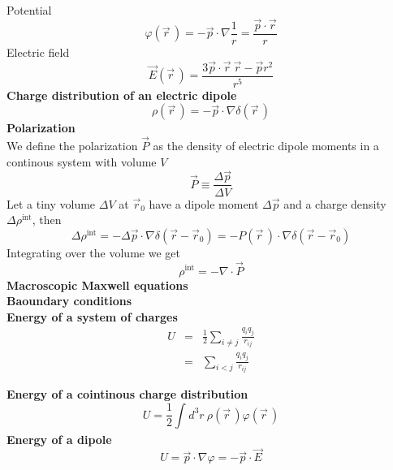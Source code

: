 \documentclass[12pt,a4paper]{article}
\newcommand{\diver}[1]{\nabla \cdot} %
\newcommand{\integral}[3]{\int_{#1}^{#2} d #3 \ } %
\begin{document}
Potential
\begin{equation}
	\varphi(\vec{r}\,) = -\vec{p}\cdot \nabla\frac{1}{r} = \frac{\vec{p}\cdot \vec{r}}{r}
\end{equation}
Electric field
\begin{equation}
	\vec{E}(\vec{r}\,) =  \frac{3\vec{p}\cdot \vec{r} \ \vec{r}-\vec{p}r^2}{r^5}
\end{equation}
\textbf{Charge distribution of an electric dipole}\\
\begin{equation}
	\rho(\vec{r}\,) = -\vec{p} \cdot \nabla \delta (\vec{r}\,)
\end{equation}
\textbf{Polarization}\\
We define the polarization $\vec{P}$ as the density of electric dipole moments in a continous system with volume $V$
\begin{equation}
	\vec{P} \equiv \frac{\Delta \vec{p}}{\Delta V}
\end{equation}
Let a tiny volume $\Delta V$ at $\vec{r}_0$ have a dipole moment $\Delta \vec{p}$ and a charge density $\Delta \rho^{\text{int}}$, then
\begin{equation}
	\Delta \rho^{\text{int}} = -\Delta \vec{p}  \cdot \nabla \delta (\vec{r} -\vec{r}_0) = - P(\vec{r}\,) \cdot \nabla \delta (\vec{r} -\vec{r}_0)
\end{equation}
Integrating over the volume we get
\begin{equation}
 \rho^{\text{int}} = -\diver{} \vec{P}
\end{equation}
\textbf{Macroscopic Maxwell equations}\\

\textbf{Baoundary conditions}\\

\textbf{Energy of a system of charges}\\
	\begin{eqnarray}
		U & = & \frac{1}{2}\sum_{i\neq j} \frac{q_iq_j}{r_{ij}} \\
		& = & \sum_{i<j}\frac{q_iq_j}{r_{ij}}
	\end{eqnarray}

\textbf{Energy of a cointinous charge distribution}\\
\begin{equation}
	U = \frac{1}{2} \integral{}{}{^3r}\rho(\vec{r}\,) \varphi (\vec{r}\,)
\end{equation}
\textbf{Energy of a dipole}\\
\begin{equation}
	U = \vec{p} \cdot \nabla \varphi = -\vec{p} \cdot \vec{E}
\end{equation}
\end{document}
